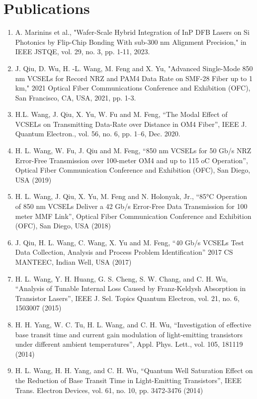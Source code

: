 \documentclass[letterpaper,11pt]{article}
\begin{document}
\section{Publications}
\begin{enumerate}

\item A. Marinins et al., "Wafer-Scale Hybrid Integration of InP DFB Lasers on Si Photonics by Flip-Chip Bonding With sub-300 nm Alignment Precision," in IEEE JSTQE, vol. 29, no. 3, pp. 1-11, 2023.
\item J. Qiu, D. Wu, H. -L. Wang, M. Feng and X. Yu, "Advanced Single-Mode 850 nm VCSELs for Record NRZ and PAM4 Data Rate on SMF-28 Fiber up to 1 km," 2021 Optical Fiber Communications Conference and Exhibition (OFC), San Francisco, CA, USA, 2021, pp. 1-3.
\item H.L. Wang, J. Qiu, X. Yu, W. Fu and M. Feng, “The Modal Effect of VCSELs on Transmitting Data-Rate over Distance in OM4 Fiber”, IEEE J. Quantum Electron., vol. 56, no. 6, pp. 1–6, Dec. 2020.  
\item H. L. Wang, W. Fu, J. Qiu and M. Feng, “850 nm VCSELs for 50 Gb/s NRZ Error-Free Transmission over 100-meter OM4 and up to 115 oC Operation”, Optical Fiber Communication Conference and Exhibition (OFC), San Diego, USA (2019)   
\item H. L. Wang, J. Qiu, X. Yu, M. Feng and N. Holonyak, Jr., “85°C Operation of 850 nm VCSELs Deliver a 42 Gb/s Error-Free Data Transmission for 100 meter MMF Link”, Optical Fiber Communication Conference and Exhibition (OFC), San Diego, USA (2018)
\item J. Qiu, H. L. Wang, C. Wang, X. Yu and M. Feng, “40 Gb/s VCSELs Test Data Collection, Analysis and Process Problem Identification” 2017 CS MANTEEC, Indian Well, USA (2017) 
\item H. L. Wang, Y. H. Huang, G. S. Cheng, S. W. Chang, and C. H. Wu, “Analysis of Tunable Internal Loss Caused by Franz-Keldysh Absorption in Transistor Lasers”, IEEE J. Sel. Topics Quantum Electron, vol. 21, no. 6, 1503007 (2015)
\item H. H. Yang, W. C. Tu, H. L. Wang, and C. H. Wu, “Investigation of effective base transit time and current gain modulation of light-emitting transistors under different ambient temperatures”, Appl. Phys. Lett., vol. 105, 181119 (2014)
\item H. L. Wang, H. H. Yang, and C. H. Wu, “Quantum Well Saturation Effect on the Reduction of Base Transit Time in Light-Emitting Transistors”, IEEE Trans. Electron Devices, vol. 61, no. 10, pp. 3472-3476 (2014)

\end{enumerate}
\end{document}
